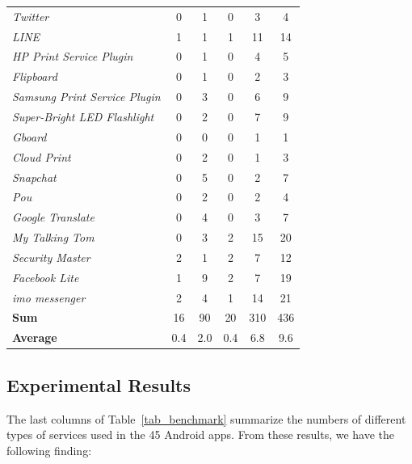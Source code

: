 \documentclass[sigconf,review, anonymous]{acmart}
\begin{document}
\begin{table}
\begin{tabular}{|l|ccccc|}
{\it Twitter}&0&1&0&3&4\\
{\it LINE}&1&1&1&11&14\\
{\it HP Print Service Plugin}&0&1&0&4&5\\
{\it Flipboard}&0&1&0&2&3\\
{\it Samsung Print Service Plugin}&0&3&0&6&9\\
{\it Super-Bright LED Flashlight}&0&2&0&7&9\\
{\it Gboard}&0&0&0&1&1\\
{\it Cloud Print}&0&2&0&1&3\\
{\it Snapchat}&0&5&0&2&7\\
{\it Pou}&0&2&0&2&4\\
{\it Google Translate}&0&4&0&3&7\\
{\it My Talking Tom}&0&3&2&15&20\\
{\it Security Master}&2&1&2&7&12\\
{\it Facebook Lite}&1&9&2&7&19 \\
{\it imo messenger}&2&4&1&14&21\\
\hline
{\bf Sum}&16&90&20&310&436\\
\hline
{\bf Average}&0.4&2.0&0.4&6.8&9.6\\
\hline
\end{tabular}
\label{tab_resultsum}
\end{table}

\subsection{Experimental Results}
The last columns of Table~\ref{tab_benchmark} summarize the numbers of different types of services used in the 45 Android apps. From these results, we have the following finding:   

\medskip
{\setlength{\parindent}{0 em}
}\\
\medskip
\end{document}
